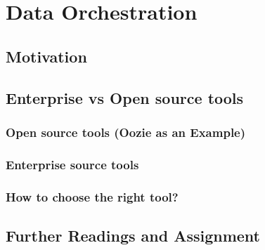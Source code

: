 \section{Data Orchestration}
\subsection{Motivation}
\subsection{Enterprise vs Open source tools}
\subsubsection{Open source tools (Oozie as an Example)}
\subsubsection{Enterprise source tools}
\subsubsection{How to choose the right tool?}
\subsection{Further Readings and Assignment}